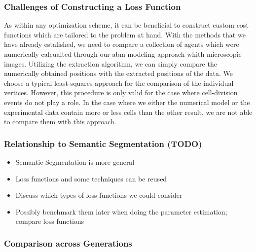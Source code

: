 \documentclass{article}
\begin{document}
\subsubsection{Challenges of Constructing a Loss Function}

As within any optimization scheme, it can be beneficial to construct custom cost functions
which are tailored to the problem at hand.
With the methods that we have already estalished, we need to compare a collection of agents which
were numerically calcualted through our \ac{abm} modeling approach whith microscopic images.
Utilizing the extraction algorithm, we can simply compare the numerically obtained positions with
the extracted positions of the data.
We choose a typical least-squares approach for the comparison of the individual vertices.
However, this procedure is only valid for the case where cell-division events do not play a role.
In the case where we either the numerical model or the experimental data contain more or less cells
than the other result, we are not able to compare them with this approach.

\subsubsection{Relationship to Semantic Segmentation (TODO)}
\label{paragraph:comparison-semantic-segmentation}
\cite{Jadon2020}

\begin{itemize}
    \item Semantic Segmentation is more general
    \item Loss functions and some techniques can be reused
    \item Discuss which types of loss functions we could consider
    \item Possibly benchmark them later when doing the parameter estimation; compare loss functions
\end{itemize}

\subsubsection{Comparison across Generations}
\label{paragraph:comparison-across-generations}
\end{document}
